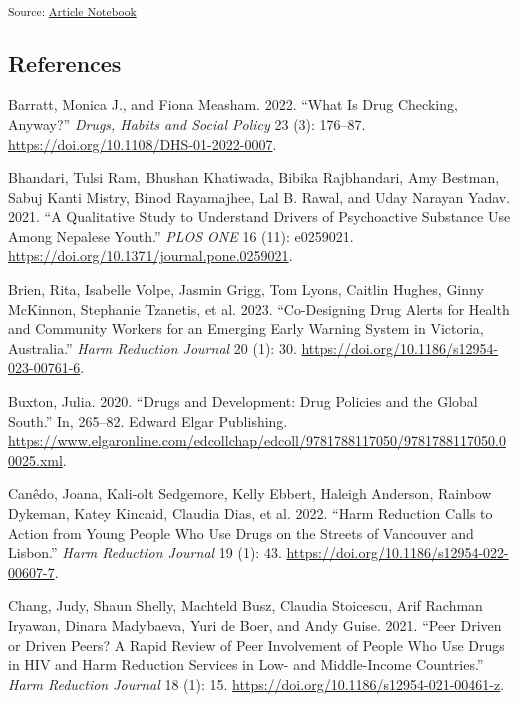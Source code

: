 \documentclass[
  letterpaper,
  DIV=11,
  numbers=noendperiod]{scrartcl}
\newlength{\cslhangindent}
\newenvironment{CSLReferences}[2] %
 {\begin{list}{}{%
  \setlength{\itemindent}{0pt}
  \setlength{\leftmargin}{0pt}
  \setlength{\parsep}{0pt}
  \ifodd #1
   \setlength{\leftmargin}{\cslhangindent}
   \setlength{\itemindent}{-1\cslhangindent}
  \fi
  \setlength{\itemsep}{#2\baselineskip}}}
 {\end{list}}
\begin{document}
\textsubscript{Source:
\href{https://mx-jx.github.io/YPWUD/index-preview.html}{Article
Notebook}}

\pagebreak

\subsection{References}\label{references}

\singlespacing

\pagebreak

\label{refs}
\begin{CSLReferences}{1}{0}
Barratt, Monica J., and Fiona Measham. 2022. {``What Is Drug Checking,
Anyway?''} \emph{Drugs, Habits and Social Policy} 23 (3): 176--87.
\url{https://doi.org/10.1108/DHS-01-2022-0007}.

Bhandari, Tulsi Ram, Bhushan Khatiwada, Bibika Rajbhandari, Amy Bestman,
Sabuj Kanti Mistry, Binod Rayamajhee, Lal B. Rawal, and Uday Narayan
Yadav. 2021. {``A Qualitative Study to Understand Drivers of
Psychoactive Substance Use Among Nepalese Youth.''} \emph{PLOS ONE} 16
(11): e0259021. \url{https://doi.org/10.1371/journal.pone.0259021}.

Brien, Rita, Isabelle Volpe, Jasmin Grigg, Tom Lyons, Caitlin Hughes,
Ginny McKinnon, Stephanie Tzanetis, et al. 2023. {``Co-Designing Drug
Alerts for Health and Community Workers for an Emerging Early Warning
System in Victoria, Australia.''} \emph{Harm Reduction Journal} 20 (1):
30. \url{https://doi.org/10.1186/s12954-023-00761-6}.

Buxton, Julia. 2020. {``Drugs and Development: Drug Policies and the
Global South.''} In, 265--82. Edward Elgar Publishing.
\url{https://www.elgaronline.com/edcollchap/edcoll/9781788117050/9781788117050.00025.xml}.

Canêdo, Joana, Kali-olt Sedgemore, Kelly Ebbert, Haleigh Anderson,
Rainbow Dykeman, Katey Kincaid, Claudia Dias, et al. 2022. {``Harm
Reduction Calls to Action from Young People Who Use Drugs on the Streets
of Vancouver and Lisbon.''} \emph{Harm Reduction Journal} 19 (1): 43.
\url{https://doi.org/10.1186/s12954-022-00607-7}.

Chang, Judy, Shaun Shelly, Machteld Busz, Claudia Stoicescu, Arif
Rachman Iryawan, Dinara Madybaeva, Yuri de Boer, and Andy Guise. 2021.
{``Peer Driven or Driven Peers? A Rapid Review of Peer Involvement of
People Who Use Drugs in HIV and Harm Reduction Services in Low- and
Middle-Income Countries.''} \emph{Harm Reduction Journal} 18 (1): 15.
\url{https://doi.org/10.1186/s12954-021-00461-z}.


\end{CSLReferences}
\end{document}
